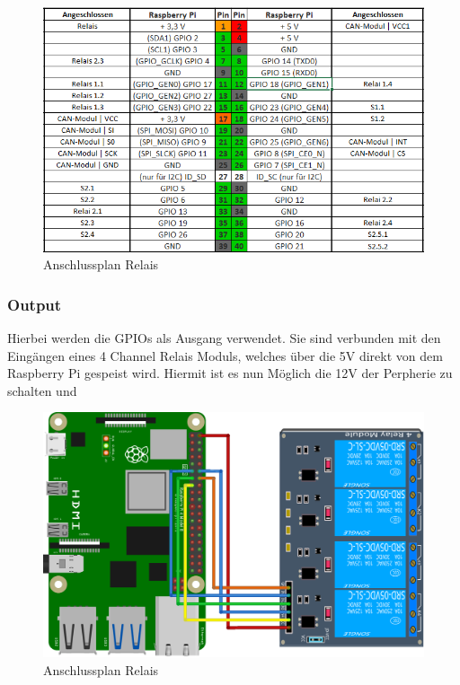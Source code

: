 \begin{figure}[H]
	\begin{center}
		\includegraphics[scale=0.6]{figures/hcis/raspi_pinout.png}
		\caption{Anschlussplan Relais}
		\label{fig:pinout}
	\end{center}
\end{figure}

\newpage

\subsubsection{Output}

Hierbei werden die GPIOs als Ausgang verwendet. Sie sind verbunden mit den Eingängen eines 4 Channel Relais Moduls, welches über die 5V direkt von dem Raspberry Pi gespeist wird. Hiermit ist es nun Möglich die 12V der Perpherie zu schalten und 

\begin{figure}[H]
	\begin{center}
		\includegraphics[scale=0.7]{figures/hcis/4ch_relai.png}
			\caption{Anschlussplan Relais}
			\label{fig:output}
	\end{center}
\end{figure}


